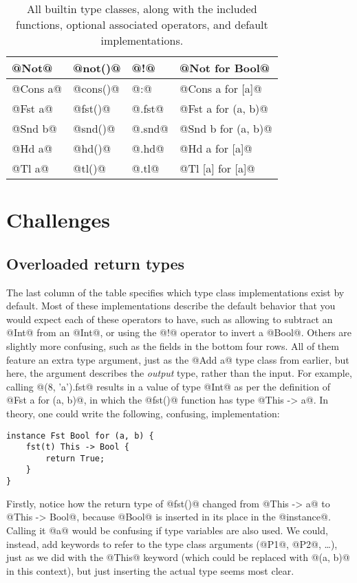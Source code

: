 \begin{table}[H]
\begin{tabular}{|p{5em}|p{5em}|p{5em}|p{20em}|}
@Not@ & @not()@ & @!@ & @Not for Bool@ \\ \hline
@Cons a@ & @cons()@ & @:@ & @Cons a for [a]@ \\ \hline
@Fst a@ & @fst()@ & @.fst@ & @Fst a for (a, b)@ \\ \hline
@Snd b@ & @snd()@ & @.snd@ & @Snd b for (a, b)@ \\ \hline
@Hd a@ & @hd()@ & @.hd@ & @Hd a for [a]@ \\ \hline
@Tl a@ & @tl()@ & @.tl@ & @Tl [a] for [a]@ \\ \hline
\end{tabular}
\caption{All builtin type classes, along with the included functions, optional associated operators, and default implementations.}
\label{table:classes}
\end{table}

\section{Challenges}

\subsection{Overloaded return types}\label{challenge:overloaded_return}
The last column of the table specifies which type class implementations exist by default. Most of these implementations describe the default behavior that you would expect each of these operators to have, such as allowing to subtract an @Int@ from an @Int@, or using the @!@ operator to invert a @Bool@. Others are slightly more confusing, such as the fields in the bottom four rows. All of them feature an extra type argument, just as the @Add a@ type class from earlier, but here, the argument describes the \textit{output} type, rather than the input. For example, calling @(8, 'a').fst@ results in a value of type @Int@ as per the definition of @Fst a for (a, b)@, in which the @fst()@ function has type @This -> a@. In theory, one could write the following, confusing, implementation:

\begin{lstlisting}
instance Fst Bool for (a, b) {
    fst(t) This -> Bool {
        return True;
    }
}
\end{lstlisting}

Firstly, notice how the return type of @fst()@ changed from @This -> a@ to @This -> Bool@, because @Bool@ is inserted in its place in the @instance@. Calling it @a@ would be confusing if type variables are also used. We could, instead, add keywords to refer to the type class arguments (@P1@, @P2@, \dots), just as we did with the @This@ keyword (which could be replaced with @(a, b)@ in this context), but just inserting the actual type seems most clear.


